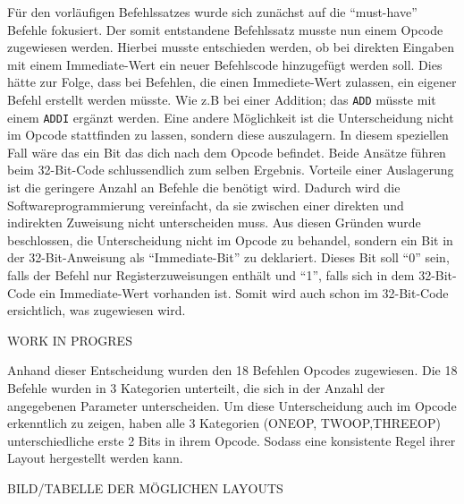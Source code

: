 \documentclass[paper=a4,fontsize=12pt,twocolumn]{scrreprt}
\begin{document}
Für den vorläufigen Befehlssatzes wurde sich zunächst auf die \enquote{must-have} Befehle fokusiert. 
Der somit entstandene Befehlssatz musste nun einem Opcode zugewiesen werden. Hierbei musste entschieden werden, ob bei direkten Eingaben mit einem Immediate-Wert ein neuer Befehlscode hinzugefügt werden soll. Dies hätte zur Folge, dass bei Befehlen, die einen Immediete-Wert zulassen, ein eigener Befehl erstellt werden müsste. Wie z.B bei einer Addition; das \texttt{ADD} müsste mit einem \texttt{ADDI} ergänzt werden.
Eine andere Möglichkeit ist die Unterscheidung nicht im Opcode stattfinden zu lassen, sondern diese auszulagern. In diesem speziellen Fall wäre das ein Bit das dich nach dem Opcode befindet.
Beide Ansätze führen beim 32-Bit-Code schlussendlich zum selben Ergebnis. 
Vorteile einer Auslagerung ist die geringere Anzahl an Befehle die benötigt wird.
Dadurch wird die Softwareprogrammierung vereinfacht, da sie zwischen einer direkten und indirekten Zuweisung nicht unterscheiden muss.
Aus diesen Gründen wurde beschlossen, die Unterscheidung nicht im Opcode zu behandel, sondern ein Bit in der 32-Bit-Anweisung als \enquote{Immediate-Bit} zu deklariert. Dieses Bit soll \enquote{0} sein, falls der Befehl nur Registerzuweisungen enthält und \enquote{1}, falls sich in dem 32-Bit-Code ein Immediate-Wert vorhanden ist. Somit wird auch schon im 32-Bit-Code ersichtlich, was zugewiesen wird.



{\color{green} WORK IN PROGRES}

Anhand dieser Entscheidung wurden den 18 Befehlen Opcodes zugewiesen. 
Die 18 Befehle wurden in 3 Kategorien unterteilt, die sich in der Anzahl der angegebenen Parameter unterscheiden. Um diese Unterscheidung auch im Opcode erkenntlich zu zeigen, haben alle 3 Kategorien (ONEOP, TWOOP,THREEOP) unterschiedliche erste 2 Bits in ihrem Opcode.
Sodass eine konsistente Regel ihrer Layout hergestellt werden kann.

BILD/TABELLE DER MÖGLICHEN LAYOUTS

\end{document}
